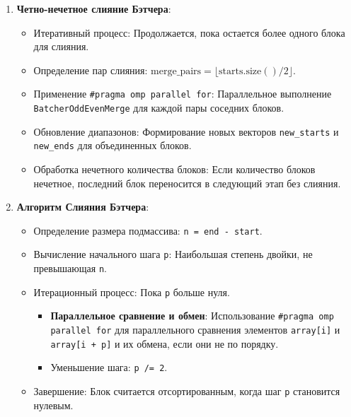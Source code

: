 \documentclass[12pt,a4paper]{extarticle}
\begin{document}
\begin{enumerate}
    \item \textbf{Четно-нечетное слияние Бэтчера}:
    \begin{itemize}
        \item Итеративный процесс: Продолжается, пока остается более одного блока для слияния.
        \item Определение пар слияния: $\mathrm{merge\_pairs} = \lfloor \mathrm{starts.size()} / 2 \rfloor$.
        \item Применение \texttt{\#pragma omp parallel for}: Параллельное выполнение \texttt{BatcherOddEvenMerge} для каждой пары соседних блоков.
        \item Обновление диапазонов: Формирование новых векторов \texttt{new\_starts} и \texttt{new\_ends} для объединенных блоков.
        \item Обработка нечетного количества блоков: Если количество блоков нечетное, последний блок переносится в следующий этап без слияния.
    \end{itemize}
    
    \item \textbf{Алгоритм Слияния Бэтчера}:
    \begin{itemize}
        \item Определение размера подмассива: \texttt{n = end - start}.
        \item Вычисление начального шага \texttt{p}: Наибольшая степень двойки, не превышающая \texttt{n}.
        \item Итерационный процесс: Пока \texttt{p} больше нуля.
        \begin{itemize}
            \item \textbf{Параллельное сравнение и обмен}: Использование \texttt{\#pragma omp parallel for} для параллельного сравнения элементов \texttt{array[i]} и \texttt{array[i + p]} и их обмена, если они не по порядку.
            \item Уменьшение шага: \texttt{p /= 2}.
        \end{itemize}
        \item Завершение: Блок считается отсортированным, когда шаг \texttt{p} становится нулевым.
    \end{itemize}
    
\end{enumerate}
\end{document}
